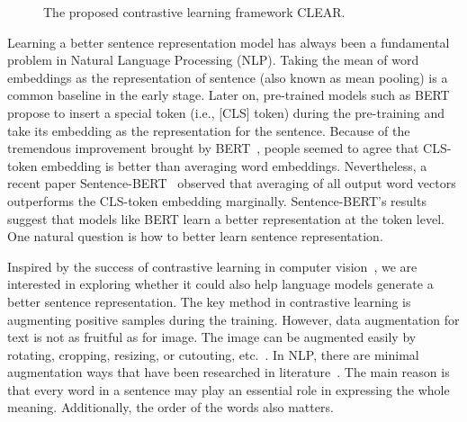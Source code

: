 \documentclass[11pt,a4paper]{article}
\begin{document}
\begin{figure*}
{ }
    \caption{The proposed contrastive learning framework CLEAR.}
    \label{fig:cl_model}
\end{figure*}


 
Learning a better sentence representation model has always been a fundamental problem in Natural Language Processing (NLP). Taking the mean of word embeddings as the representation of sentence (also known as mean pooling) is a common baseline in the early stage. Later on, pre-trained  models such as BERT~\cite{devlin2019bert} propose to insert a special token (i.e., [CLS] token) during the pre-training and take its embedding as the representation for the sentence. Because of the tremendous improvement brought by BERT~\cite{devlin2019bert}, people seemed to agree that CLS-token embedding is better than averaging word embeddings. Nevertheless, a recent paper Sentence-BERT~\cite{reimers2019sentence} observed that averaging of all output word vectors outperforms the CLS-token embedding marginally. Sentence-BERT's results suggest that models like BERT learn a better representation at the token level. One natural question is how to better learn sentence representation.

Inspired by the success of contrastive learning in computer vision~\cite{zhuang2019local, tian2019contrastive, he2020momentum, chen2020simple, misra2020self}, we are interested in exploring whether it could also help language models generate a better sentence representation. The key method in contrastive learning is augmenting positive samples during the training. However, data augmentation for text is not as fruitful as for image. The image can be augmented easily by rotating, cropping, resizing, or cutouting, etc.~\cite{chen2020simple}. 
In NLP, there are minimal augmentation ways that have been researched in literature~\cite{giorgi2020declutr, fang2020cert}. 
The main reason is that every word in a sentence may play an essential role in expressing the whole meaning. Additionally, the order of the words also matters. 
\end{document}

